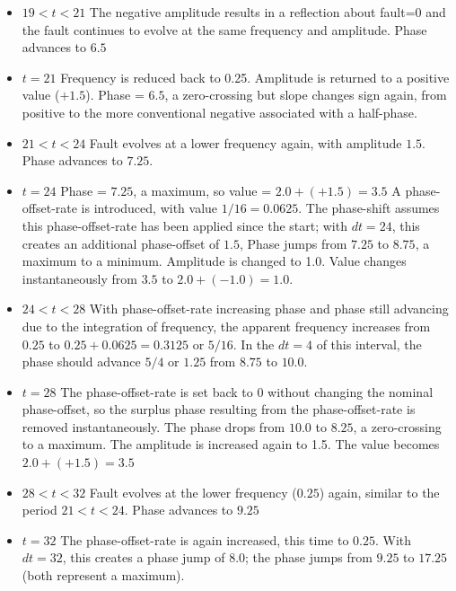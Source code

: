 \documentclass[11pt,fleqn]{report}
\begin{document}
\begin{itemize}
       negative amplitude. Phase = $5.5$, a zero-crossing. The negation of
       the amplitude should result in the slope changing from negative (which
       is expected of a sine-wave with phase of $5.5$) to positive.
 \item $19<t<21$ The negative amplitude results in a reflection about fault=0
       and the fault continues to evolve at the same frequency and amplitude.
       Phase advances to $6.5$
 \item $t=21$ Frequency is reduced back to 0.25. Amplitude is returned to a
       positive value ($+1.5$).
       Phase = $6.5$, a zero-crossing but slope changes sign
       again, from positive to the more conventional negative associated with
       a half-phase.
 \item $21<t<24$ Fault evolves at a lower frequency again, with amplitude
       $1.5$. Phase advances to $7.25$.
 \item $t=24$ Phase = $7.25$, a maximum, so value = $2.0 + (+1.5) = 3.5$
       A phase-offset-rate is introduced, with value $1/16 = 0.0625$. The
       phase-shift assumes this phase-offset-rate has been applied since the
       start; with $dt = 24$, this creates an additional phase-offset of $1.5$,
       Phase jumps from $7.25$ to $8.75$, a maximum to a minimum.
       Amplitude is changed to 1.0. Value changes instantaneously from $3.5$
       to $2.0 + (-1.0) = 1.0$.
 \item $24<t<28$ With phase-offset-rate increasing phase and phase still
       advancing due to the integration of frequency, the apparent frequency
       increases from $0.25$ to $0.25 + 0.0625 = 0.3125$ or $5/16$. In the
       $dt=4$ of this interval, the phase should advance $5/4$ or $1.25$ from
       $8.75$ to $10.0$.
 \item $t=28$ The phase-offset-rate is set back to 0 without changing the
       nominal phase-offset, so the surplus phase resulting from the
       phase-offset-rate is removed instantaneously. The phase drops from
       $10.0$ to $8.25$, a zero-crossing to a maximum. The amplitude is
       increased again to 1.5. The value becomes $2.0 + (+1.5) = 3.5$
 \item $28<t<32$ Fault evolves at the lower frequency ($0.25$) again,
       similar to the period $21<t<24$. Phase advances to $9.25$
 \item $t=32$ The phase-offset-rate is again increased, this time to $0.25$.
       With $dt=32$, this creates a phase jump of $8.0$; the phase jumps
       from $9.25$ to $17.25$ (both represent a maximum).

\end{itemize}
\end{document}

